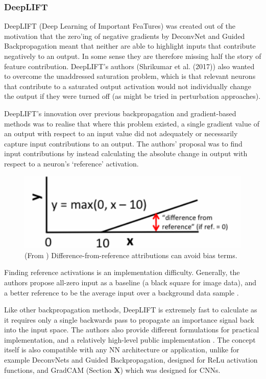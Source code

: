 \documentclass[main]{subfiles}
\begin{document}
\subsubsection{DeepLIFT}

DeepLIFT (Deep Learning of Important FeaTures) \cite{deeplift} was created out of the motivation that the zero'ing of negative gradients by DeconvNet and Guided Backpropagation meant that neither are able to highlight inputs that contribute negatively to an output. In some sense they are therefore missing half the story of feature contribution. DeepLIFT's authors (Shrikumar et al. (2017)) also wanted to overcome the unaddressed saturation problem, which is that relevant neurons that contribute to a saturated output activation would not individually change the output if they were turned off (as might be tried in perturbation approaches).

DeepLIFT's innovation over previous backpropagation and gradient-based methods was to realise that where this problem existed, a single gradient value of an output with respect to an input value did not adequately or necessarily capture input contributions to an output. The authors' proposal was to find input contributions by instead calculating the absolute change in output with respect to a neuron's `reference' activation. 

\begin{figure}[h]
\centering
\includegraphics[scale=0.3]{deeplift.png}
\caption{(From \cite{deeplift}) Difference-from-reference attributions can avoid bias terms.}
\label{deepliftimg}
\end{figure}

Finding reference activations is an implementation difficulty. Generally, the authors propose all-zero input as a baseline (a black square for image data), and a better reference to be the average input over a background data sample \cite{deeplift}.

Like other backpropagation methods, DeepLIFT is extremely fast to calculate as it requires only a single backwards pass to propagate an importance signal back into the input space. The authors also provide different formulations for practical implementation, and a relatively high-level public implementation \cite{deepliftrepo}. The concept itself is also compatible with any NN architecture or application, unlike for example DeconvNets and Guided Backpropagation, designed for ReLu activation functions, and GradCAM (Section \textbf{X}) which was designed for CNNs.
\end{document}
